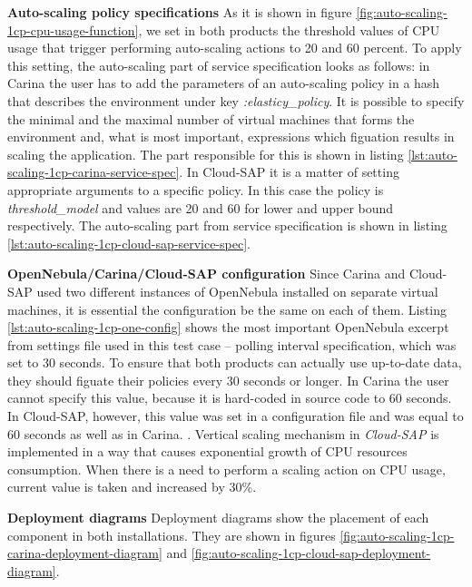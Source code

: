 \begin{asparaenum}
  \item[\textbf{Auto-scaling policy specifications}] As it is shown in figure \ref{fig:auto-scaling-1cp-cpu-usage-function}, we set in both products the threshold values of CPU usage that trigger performing auto-scaling actions to 20 and 60 percent. To apply this setting, the auto-scaling part of service specification looks as follows: in Carina the user has to add the parameters of an auto-scaling policy in a hash that describes the environment under key \emph{:elasticy\_policy}. It is possible to specify the minimal and the maximal number of virtual machines that forms the environment and, what is most important, expressions which figuation results in scaling the application. The part responsible for this is shown in listing \ref{lst:auto-scaling-1cp-carina-service-spec}. In Cloud-SAP it is a matter of setting appropriate arguments to a specific policy. In this case the policy is \emph{threshold\_model} and values are 20 and 60 for lower and upper bound respectively. The auto-scaling part from service specification is shown in listing \ref{lst:auto-scaling-1cp-cloud-sap-service-spec}. 
  \item[\textbf{OpenNebula/Carina/Cloud-SAP configuration}] Since Carina and Cloud-SAP used two different instances of OpenNebula installed on separate virtual machines, it is essential the configuration be the same on each of them. Listing \ref{lst:auto-scaling-1cp-one-config} shows the most important OpenNebula excerpt from settings file used in this test case -- polling interval specification, which was set to 30 seconds. To ensure that both products can actually use up-to-date data, they should figuate their policies every 30 seconds or longer. In Carina the user cannot specify this value, because it is hard-coded in source code to 60 seconds. In Cloud-SAP, however, this value was set in a configuration file and was equal to 60 seconds as well as in Carina. . Vertical scaling mechanism in \emph{Cloud-SAP} is implemented in a way that causes exponential growth of CPU resources consumption. When there is a need to perform a scaling action on CPU usage, current value is taken and increased by 30\%.
  \item[\textbf{Deployment diagrams}] Deployment diagrams show the placement of each component in both installations. They are shown in figures \ref{fig:auto-scaling-1cp-carina-deployment-diagram} and \ref{fig:auto-scaling-1cp-cloud-sap-deployment-diagram}.


\end{asparaenum}
